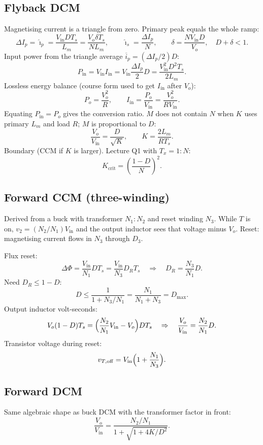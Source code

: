 \subsection{Flyback DCM}
Magnetising current is a triangle from zero. Primary peak equals the whole ramp:
\[
\Delta I_p=\hat{\imath}_p=\frac{V_{\mathrm{in}} D T_s}{L_m}=\frac{V_o\delta T_s}{N L_m},\qquad
\hat{\imath}_s=\frac{\Delta I_p}{N},\qquad
\delta=\frac{N V_{\mathrm{in}} D}{V_o},\quad D+\delta<1.
\]
Input power from the triangle average \(\overline{i}_p=(\Delta I_p/2)D\):
\[
P_{\mathrm{in}}=V_{\mathrm{in}} I_{\mathrm{in}}=V_{\mathrm{in}}\frac{\Delta I_p}{2}D=\frac{V_{\mathrm{in}}^2 D^2 T_s}{2 L_m}.
\]
Lossless energy balance (course form used to get \(I_{\mathrm{in}}\) after \(V_o\)):
\[
P_o=\frac{V_o^2}{R},\qquad I_{\mathrm{in}}=\frac{P_o}{V_{\mathrm{in}}}=\frac{V_o^2}{R V_{\mathrm{in}}}.
\]
Equating \(P_{\mathrm{in}}=P_o\) gives the conversion ratio. \(M\) does not contain \(N\) when \(K\) uses primary \(L_m\) and load \(R\); \(M\) is proportional to \(D\):
\[
\frac{V_o}{V_{\mathrm{in}}}=\frac{D}{\sqrt{K}},\qquad K=\frac{2 L_m}{R T_s}.
\]
Boundary (CCM if \(K\) is larger). Lecture Q1 with \(T_x=1:N\):
\[
K_{\mathrm{crit}}=\left(\frac{1-D}{N}\right)^2.
\]

\subsection{Forward CCM (three-winding)}
Derived from a buck with transformer \(N_1:N_2\) and reset winding \(N_3\). While \(T\) is on, \(v_2=(N_2/N_1)V_{\mathrm{in}}\) and the output inductor sees that voltage minus \(V_o\). Reset: magnetising current flows in \(N_3\) through \(D_3\).

Flux reset:
\[
\Delta\Phi=\frac{V_{\mathrm{in}}}{N_1}D T_s=\frac{V_{\mathrm{in}}}{N_3}D_R T_s \quad\Rightarrow\quad D_R=\frac{N_3}{N_1}D.
\]
Need \(D_R\le 1-D\):
\[
D\le \frac{1}{1+N_3/N_1}=\frac{N_1}{N_1+N_3}=D_{\max}.
\]
Output inductor volt-seconds:
\[
V_o(1-D)T_s=\Bigl(\frac{N_2}{N_1}V_{\mathrm{in}}-V_o\Bigr)D T_s \quad\Rightarrow\quad
\frac{V_o}{V_{\mathrm{in}}}=\frac{N_2}{N_1}D.
\]
Transistor voltage during reset:
\[
v_{T,\mathrm{off}}=V_{\mathrm{in}}\Bigl(1+\frac{N_1}{N_3}\Bigr).
\]

\subsection{Forward DCM}
Same algebraic shape as buck DCM with the transformer factor in front:
\[
\frac{V_o}{V_{\mathrm{in}}}=\frac{N_2/N_1}{1+\sqrt{1+4K/D^2}}.
\]

